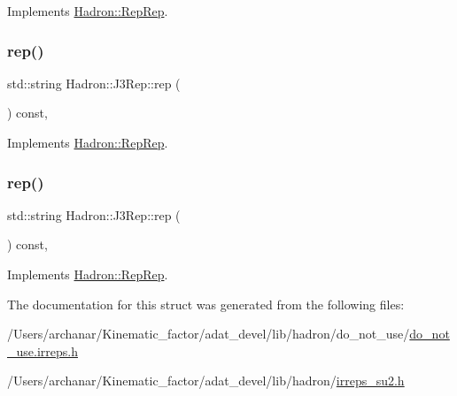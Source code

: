 Implements \mbox{\hyperlink{structHadron_1_1RepRep_ab3213025f6de249f7095892109575fde}{Hadron\+::\+Rep\+Rep}}.

\mbox{\label{structHadron_1_1J3Rep_ab890e5844d6c221d555b2049711e89a6}} 
\subsubsection{\texorpdfstring{rep()}{rep()}\hspace{0.1cm}{\footnotesize\ttfamily [2/3]}}
{\footnotesize\ttfamily std\+::string Hadron\+::\+J3\+Rep\+::rep (\begin{DoxyParamCaption}{ }\end{DoxyParamCaption}) const\hspace{0.3cm}{\ttfamily [inline]}, {\ttfamily [virtual]}}



Implements \mbox{\hyperlink{structHadron_1_1RepRep_ab3213025f6de249f7095892109575fde}{Hadron\+::\+Rep\+Rep}}.

\mbox{\label{structHadron_1_1J3Rep_ab890e5844d6c221d555b2049711e89a6}} 
\subsubsection{\texorpdfstring{rep()}{rep()}\hspace{0.1cm}{\footnotesize\ttfamily [3/3]}}
{\footnotesize\ttfamily std\+::string Hadron\+::\+J3\+Rep\+::rep (\begin{DoxyParamCaption}{ }\end{DoxyParamCaption}) const\hspace{0.3cm}{\ttfamily [inline]}, {\ttfamily [virtual]}}



Implements \mbox{\hyperlink{structHadron_1_1RepRep_ab3213025f6de249f7095892109575fde}{Hadron\+::\+Rep\+Rep}}.



The documentation for this struct was generated from the following files\+:\begin{DoxyCompactItemize}
\item 
/\+Users/archanar/\+Kinematic\+\_\+factor/adat\+\_\+devel/lib/hadron/do\+\_\+not\+\_\+use/\mbox{\hyperlink{do__not__use_8irreps_8h}{do\+\_\+not\+\_\+use.\+irreps.\+h}}\item 
/\+Users/archanar/\+Kinematic\+\_\+factor/adat\+\_\+devel/lib/hadron/\mbox{\hyperlink{lib_2hadron_2irreps__su2_8h}{irreps\+\_\+su2.\+h}}\end{DoxyCompactItemize}
